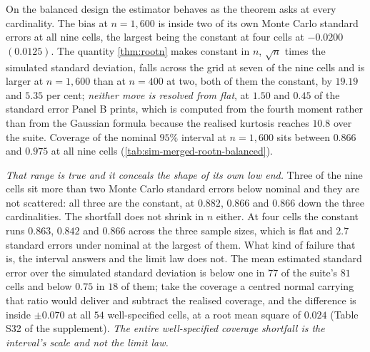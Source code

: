 \documentclass[
  12pt]{article}
\newcommand{\1}[1]{\mathds{1}\left[#1\right]}
\theoremstyle{plain}
\theoremstyle{definition}
\theoremstyle{definition}
\theoremstyle{remark}
\begin{document}
On the balanced design the estimator behaves as the theorem asks at
every cardinality. The bias at \(n=1{,}600\) is inside two of its own
Monte Carlo standard errors at all nine cells, the largest being the
constant at four cells at \(-0.0200\) \((0.0125)\). The quantity
\cref{thm:rootn} makes constant in \(n\), \(\sqrt n\) times the
simulated standard deviation, falls across the grid at seven of the nine
cells and is larger at \(n=1{,}600\) than at \(n=400\) at two, both of
them the constant, by \(19.19\) and \(5.35\) per cent; \emph{neither
move is resolved from flat}, at \(1.50\) and \(0.45\) of the standard
error Panel B prints, which is computed from the fourth moment rather
than from the Gaussian formula because the realised kurtosis reaches
\(10.8\) over the suite. Coverage of the nominal \(95\%\) interval at
\(n=1{,}600\) sits between \(0.866\) and \(0.975\) at all nine cells
(\cref{tab:sim-merged-rootn-balanced}).

\emph{That range is true and it conceals the shape of its own low end.}
Three of the nine cells sit more than two Monte Carlo standard errors
below nominal and they are not scattered: all three are the constant, at
\(0.882\), \(0.866\) and \(0.866\) down the three cardinalities. The
shortfall does not shrink in \(n\) either. At four cells the constant
runs \(0.863\), \(0.842\) and \(0.866\) across the three sample sizes,
which is flat and \(2.7\) standard errors under nominal at the largest
of them. What kind of failure that is, the interval answers and the
limit law does not. The mean estimated standard error over the simulated
standard deviation is below one in \(77\) of the suite's \(81\) cells
and below \(0.75\) in \(18\) of them; take the coverage a centred normal
carrying that ratio would deliver and subtract the realised coverage,
and the difference is inside \(\pm0.070\) at all \(54\) well-specified
cells, at a root mean square of \(0.024\) (Table S32 of the supplement).
\emph{The entire well-specified coverage shortfall is the interval's
scale and not the limit law.}
\end{document}
